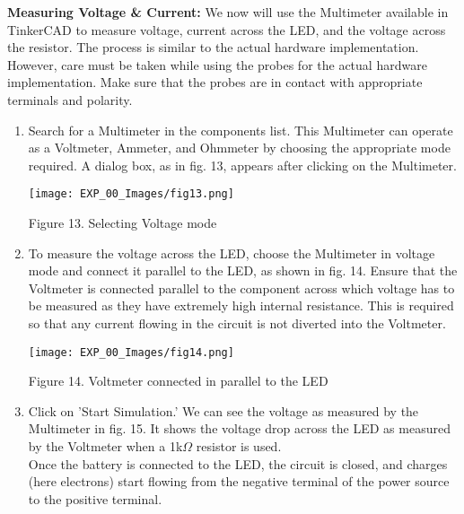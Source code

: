 \documentclass[12pt,a4paper]{article}
\begin{document}
\begin{justify}
 \noindent \textbf{Measuring Voltage \& Current:} We now will use the Multimeter available in TinkerCAD to measure voltage, current across the LED, and the voltage across the resistor. The process is similar to the actual hardware implementation. However, care must be taken while using the probes for the actual hardware implementation. Make sure that the probes are in contact with appropriate terminals and polarity.

 \begin{enumerate}
 \item Search for a Multimeter in the components list. This Multimeter can operate as a Voltmeter, Ammeter, and Ohmmeter by choosing the appropriate mode required. A dialog box, as in fig. 13, appears after clicking on the Multimeter.

\begin{center} 
\texttt{[image: EXP\_00\_Images/fig13.png]}
\end{center}
\vspace{-8mm}
\begin{center} {Figure 13. Selecting Voltage mode}\end{center}

\item To measure the voltage across the LED, choose the Multimeter in voltage mode and connect it parallel to the LED, as shown in fig. 14. Ensure that the Voltmeter is connected parallel to the component across which voltage has to be measured as they have extremely high internal resistance. This is required so that any current flowing in the circuit is not diverted into the Voltmeter.

\begin{center} 
\texttt{[image: EXP\_00\_Images/fig14.png]}
\end{center}
\vspace{-8mm}
\begin{center} {Figure 14. Voltmeter connected in parallel to the LED}\end{center}

\item Click on 'Start Simulation.' We can see the voltage as measured by the Multimeter in fig. 15. It shows the voltage drop across the LED as measured by the Voltmeter when a 1k$\Omega$ resistor is used.\\[6pt]
Once the battery is connected to the LED, the circuit is closed, and charges (here electrons) start flowing from the negative terminal of the power source to the positive terminal.


\end{enumerate}
\end{justify}
\end{document}
